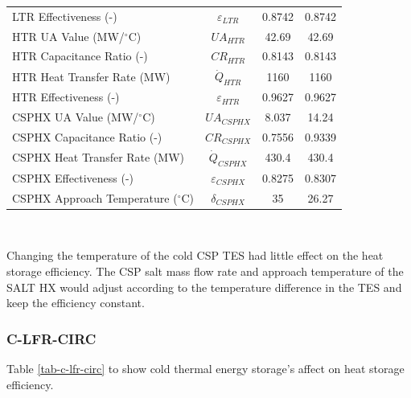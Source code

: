 \begin{paracol}{2}
\begin{specialtable}[H]
\begin{tabular}{lccc}
    LTR Effectiveness (-)	&	$\varepsilon_{LTR}$	&	0.8742	&	0.8742	\\
    HTR UA Value (MW/$^{\circ}$C)	&	$UA_{HTR}$	&	42.69	&	42.69	\\
    HTR Capacitance Ratio (-)	&	$CR_{HTR}$	&	0.8143	&	0.8143	\\
    HTR Heat Transfer Rate (MW)	&	$\dot{Q}_{HTR}$	&	1160	&	1160	\\
    HTR Effectiveness (-)	&	$\varepsilon_{HTR}$	&	0.9627	&	0.9627	\\
    CSPHX UA Value (MW/$^{\circ}$C)	&	$UA_{CSPHX}$	&	8.037	&	14.24	\\
    CSPHX Capacitance Ratio (-)	&	$CR_{CSPHX}$	&	0.7556	&	0.9339	\\
    CSPHX Heat Transfer Rate (MW)	&	$\dot{Q}_{CSPHX}$	&	430.4	&	430.4	\\
    CSPHX Effectiveness (-)	&	$\varepsilon_{CSPHX}$	&	0.8275	&	0.8307	\\
    CSPHX Approach Temperature ($^{\circ}$C)	&	$\delta_{CSPHX}$	&	35	&	26.27	\\
    \bottomrule
    \end{tabular}\\
\end{specialtable}

Changing the temperature of the cold CSP TES had little effect on the heat storage efficiency. The CSP salt mass flow rate and approach temperature of the SALT HX would adjust according to the temperature difference in the TES and keep the efficiency constant.


\subsubsection{C-LFR-CIRC}

Table \ref{tab-c-lfr-circ} to show cold thermal energy storage's affect on heat storage efficiency.


\end{paracol}
